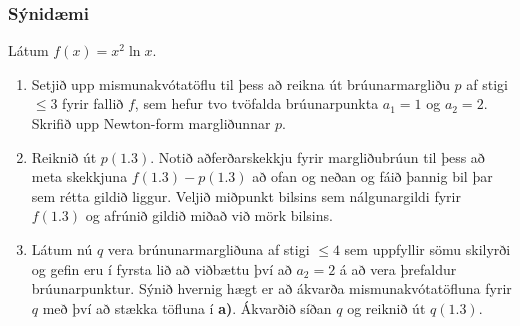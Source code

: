 \documentclass[a4paper,10pt,icelandic]{sphinxmanual}
\begin{document}
\subsubsection{Sýnidæmi}
\label{kafli03:id10}
Látum \(f(x)=x^2\ln x\).
\begin{enumerate}
\item {} 
Setjið upp mismunakvótatöflu til þess að reikna út brúunarmargliðu
\(p\) af stigi \(\leq 3\) fyrir fallið \(f\), sem hefur tvo
tvöfalda brúunarpunkta \(a_1=1\) og \(a_2=2\). Skrifið upp
Newton-form margliðunnar \(p\).

\item {} 
Reiknið út \(p(1.3)\). Notið aðferðarskekkju fyrir margliðubrúun
til þess að meta skekkjuna \(f(1.3)-p(1.3)\) að ofan og neðan og
fáið þannig bil þar sem rétta gildið liggur. Veljið miðpunkt bilsins sem
nálgunargildi fyrir \(f(1.3)\) og afrúnið gildið miðað við mörk
bilsins.

\item {} 
Látum nú \(q\) vera brúnunarmargliðuna af stigi \(\leq 4\) sem
uppfyllir sömu skilyrði og gefin eru í fyrsta lið að viðbættu því að
\(a_2=2\) á að vera þrefaldur brúunarpunktur. Sýnið hvernig hægt er
að ákvarða mismunakvótatöfluna fyrir \(q\) með því að stækka töfluna
í \textbf{a)}. Ákvarðið síðan \(q\) og reiknið út \(q(1.3)\).

\end{enumerate}
\end{document}
